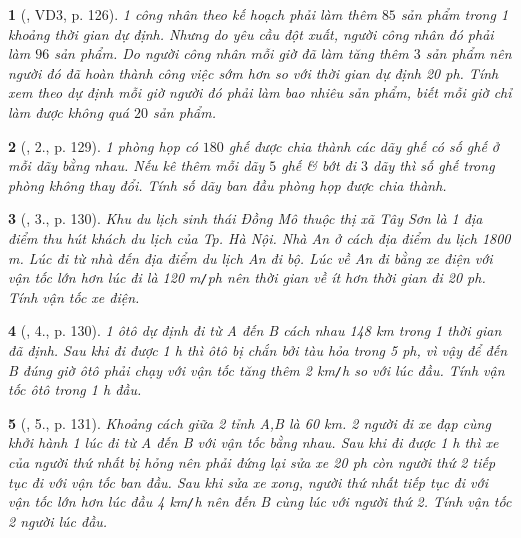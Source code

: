 \documentclass{article}
\newtheorem{baitoan}{}
\begin{document}
\begin{baitoan}[\cite{Kien_dai_so_9}, VD3, p. 126]
	1 công nhân theo kế hoạch phải làm thêm $85$ sản phẩm trong 1 khoảng thời gian dự định. Nhưng do yêu cầu đột xuất, người công nhân đó phải làm $96$ sản phẩm. Do người công nhân mỗi giờ đã làm tăng thêm $3$ sản phẩm nên người đó đã hoàn thành công việc sớm hơn so với thời gian dự định {\rm20 ph}. Tính xem theo dự định mỗi giờ người đó phải làm bao nhiêu sản phẩm, biết mỗi giờ chỉ làm được không quá $20$ sản phẩm.
\end{baitoan}

\begin{baitoan}[\cite{Kien_dai_so_9}, 2., p. 129]
	1 phòng họp có $180$ ghế được chia thành các dãy ghế có số ghế ở mỗi dãy bằng nhau. Nếu kê thêm mỗi dãy $5$ ghế \& bớt đi $3$ dãy thì số ghế trong phòng không thay đổi. Tính số dãy ban đầu phòng họp được chia thành.
\end{baitoan}

\begin{baitoan}[\cite{Kien_dai_so_9}, 3., p. 130]
	Khu du lịch sinh thái Đồng Mô thuộc thị xã Tây Sơn là 1 địa điểm thu hút khách du lịch của Tp. Hà Nội. Nhà An ở cách địa điểm du lịch {\rm1800 m}. Lúc đi từ nhà đến địa điểm du lịch An đi bộ. Lúc về An đi bằng xe điện với vận tốc lớn hơn lúc đi là {\rm120 m{\tt/}ph} nên thời gian về ít hơn thời gian đi {\rm20 ph}. Tính vận tốc xe điện.
\end{baitoan}

\begin{baitoan}[\cite{Kien_dai_so_9}, 4., p. 130]
	1 ôtô dự định đi từ A đến B cách nhau {\rm148 km} trong 1 thời gian đã định. Sau khi đi được {\rm1 h} thì ôtô bị chắn bởi tàu hỏa trong {\rm5 ph}, vì vậy để đến B đúng giờ ôtô phải chạy với vận tốc tăng thêm {\rm2 km{\tt/}h} so với lúc đầu. Tính vận tốc ôtô trong {\rm1 h} đầu.
\end{baitoan}

\begin{baitoan}[\cite{Kien_dai_so_9}, 5., p. 131]
	Khoảng cách giữa 2 tỉnh A,B là {\rm60 km}. 2 người đi xe đạp cùng khởi hành 1 lúc đi từ A đến B với vận tốc bằng nhau. Sau khi đi được {\rm1 h} thì xe của người thứ nhất bị hỏng nên phải đứng lại sửa xe {\rm20 ph} còn người thứ 2 tiếp tục đi với vận tốc ban đầu. Sau khi sửa xe xong, người thứ nhất tiếp tục đi với vận tốc lớn hơn lúc đầu {\rm4 km{\tt/}h} nên đến B cùng lúc với người thứ 2. Tính vận tốc 2 người lúc đầu.
\end{baitoan}
\end{document}
